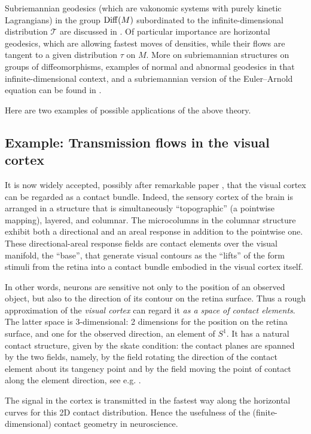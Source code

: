 \documentclass[11pt]{article}
\theoremstyle{definition}
\newcounter{ai}
\begin{document}
Subriemannian 
geodesics  (which are vakonomic systems with purely kinetic Lagrangians) in the group ${\rm Diff}(M)$ subordinated to the infinite-dimensional distribution  $\mathcal T$
are discussed in \cite{khesin2009nonholonomic, agrachev2009optimal}. Of particular importance are horizontal geodesics, which are allowing fastest moves of densities, while their flows are tangent to a given distribution $\tau$ on $M$. 
More on subriemannian structures on groups of diffeomorphisms,  examples of normal and  abnormal geodesics in that infinite-dimensional context, and a subriemannian version of the Euler--Arnold equation can be found in 
\cite{Arguillre2014}.

Here are two examples of possible applications of the above theory. 
\medskip

\subsection{Example: Transmission flows  in the visual cortex}
\label{sec:visualcortex}

It is now widely accepted, possibly after remarkable paper \cite{hoffman1989visual}, 
that the visual cortex can be regarded as a contact bundle. Indeed, 
the sensory cortex of the
brain is arranged in a structure that is simultaneously ``topographic'' (a pointwise
mapping), layered, and columnar. The microcolumns in the columnar structure
exhibit both a directional and an areal response in addition to the pointwise one. 
These directional-areal response fields are contact elements over the visual
manifold, the ``base'', that generate visual contours as the ``lifts'' of the form stimuli from the
retina into a contact bundle embodied in the visual cortex itself.

In other words, neurons are sensitive not only to the position of an observed object, but also to the
direction of its contour on the retina surface. Thus a rough approximation of the {\it visual cortex}  can regard it {\it as a space of contact elements}.
The latter space is 3-dimensional: 2 dimensions for the position on the retina surface, and one for the observed direction, an element of $S^1$. It has a natural contact structure, given by the skate condition: the contact planes are spanned by the two fields, namely, by the field rotating the direction of the contact element about its tangency point and by the field moving the point of contact along the element direction, see e.g. \cite{arnold1989mathematical}.

The signal in the cortex 
is transmitted in the fastest way along the horizontal curves for this 2D contact distribution. 
Hence the usefulness of the (finite-dimensional) contact geometry in neuroscience.
\end{document}
